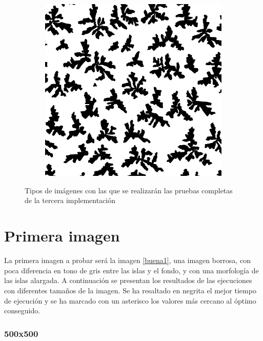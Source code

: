 \begin{figure}[H]
\begin{center}
\begin{subfigure}[t]{2.5in}
			\includegraphics[width=.8\textwidth]{./imagenes/buena3}	
			\subcaption{}\label{buena3}
		\end{subfigure}
	\end{center}
	\caption{Tipos de im\'{a}genes con las que se realizar\'{a}n las pruebas completas de la tercera implementaci\'{o}n}
	\label{tiposImagenes}
\end{figure} 


\section{Primera imagen}

La primera imagen a probar ser\'{a} la imagen \ref{buena1}, una imagen borrosa, con poca diferencia en tono de gris entre las islas y el fondo, y con una morfolog\'{i}a de las islas alargada. A continuaci\'{o}n se presentan los resultados de las ejecuciones con diferentes tama\~{n}os de la imagen. Se ha resaltado en negrita el mejor tiempo de ejecuci\'{o}n y se ha marcado con un asterisco los valores m\'{a}s cercano al \'{o}ptimo conseguido.

\subsubsection{500x500}

